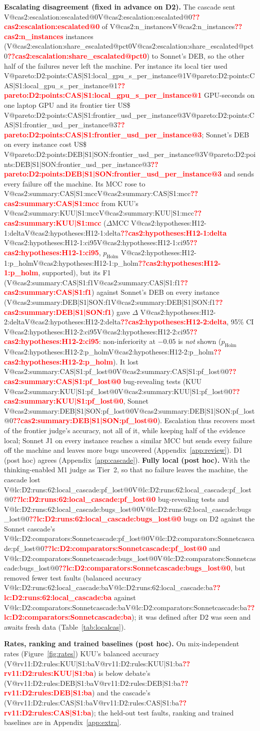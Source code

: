 \documentclass[pdflatex,iicol,sn-mathphys-num]{sn-jnl}
\makeatletter
\newcommand{\V}[1]{\ifcsname V@#1\endcsname\csname V@#1\endcsname\else\textbf{\textcolor{red}{??#1}}\fi}
\makeatother
\begin{document}
\textbf{Escalating disagreement (fixed in advance on D2).} The cascade sent \V{cas2:escalation:escalated@0} of \V{cas2:n_instances} instances (\V{cas2:escalation:share_escalated@pct0}) to Sonnet's DEB, so the other half of the failures never left the machine. Per instance its local tier used \V{pareto:D2:points:CAS|S1:local_gpu_s_per_instance@1} GPU-seconds on one laptop GPU and its frontier tier US\$\,\V{pareto:D2:points:CAS|S1:frontier_usd_per_instance@3}; Sonnet's DEB on every instance cost US\$\,\V{pareto:D2:points:DEB|S1|SON:frontier_usd_per_instance@3} and sends every failure off the machine. Its MCC rose to \V{cas2:summary:CAS|S1:mcc} from KUU's \V{cas2:summary:KUU|S1:mcc} ($\Delta$MCC \V{cas2:hypotheses:H12-1:delta} \V{cas2:hypotheses:H12-1:ci95}, $p_\mathrm{Holm}$ \V{cas2:hypotheses:H12-1:p_holm}, supported), but its F1 (\V{cas2:summary:CAS|S1:f1}) against Sonnet's DEB on every instance (\V{cas2:summary:DEB|S1|SON:f1}) gave $\Delta$ \V{cas2:hypotheses:H12-2:delta}, 95\% CI \V{cas2:hypotheses:H12-2:ci95}: non-inferiority at $-0.05$ is \emph{not} shown ($p_\mathrm{Holm}$ \V{cas2:hypotheses:H12-2:p_holm}). It lost \V{cas2:summary:CAS|S1:pf_lost@0} bug-revealing tests (KUU \V{cas2:summary:KUU|S1:pf_lost@0}, Sonnet \V{cas2:summary:DEB|S1|SON:pf_lost@0}). Escalation thus recovers most of the frontier judge's accuracy, not all of it, while keeping half of the evidence local; Sonnet J1 on every instance reaches a similar MCC but sends every failure off the machine and leaves more bugs uncovered (Appendix~\ref{app:review}). D1 (post hoc) agrees (Appendix~\ref{app:cascade}). \textbf{Fully local (post hoc).} With the thinking-enabled M1 judge as Tier~2, so that no failure leaves the machine, the cascade lost \V{lc:D2:runs:62:local_cascade:pf_lost@0} bug-revealing tests and \V{lc:D2:runs:62:local_cascade:bugs_lost@0} bugs on D2 against the Sonnet cascade's \V{lc:D2:comparators:Sonnetcascade:pf_lost@0} and \V{lc:D2:comparators:Sonnetcascade:bugs_lost@0}, but removed fewer test faults (balanced accuracy \V{lc:D2:runs:62:local_cascade:ba} against \V{lc:D2:comparators:Sonnetcascade:ba}); it was defined after D2 was seen and awaits fresh data (Table~\ref{tab:localcas}).

\textbf{Rates, ranking and trained baselines (post hoc).} On mix-independent rates (Figure~\ref{fig:rates}) KUU's balanced accuracy (\V{rv11:D2:rules:KUU|S1:ba}) is below debate's (\V{rv11:D2:rules:DEB|S1:ba}) and the cascade's (\V{rv11:D2:rules:CAS|S1:ba}); the held-out test faults, ranking and trained baselines are in Appendix~\ref{app:extra}.
\end{document}
